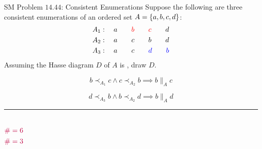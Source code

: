 
\begin{frame}{}
  \begin{exampleblock}{SM Problem $14.44$: Consistent Enumerations}
    Suppose the following are three consistent enumerations of an ordered set $A = \{a, b, c, d\}$:
    \begin{align*}
      A_1: \quad a \qquad \textcolor{red}{b} \qquad \textcolor{red}{c} \qquad d \\
      A_2: \quad a \qquad c \qquad b \qquad d \\
      A_3: \quad a \qquad c \qquad \textcolor{blue}{d} \qquad \textcolor{blue}{b}
    \end{align*}
    Assuming the Hasse diagram $D$ of $A$ is , draw $D$.
  \end{exampleblock}

  \pause
  \[
    b \prec_{A_1} c \land c \prec_{A_2} b \implies b \parallel_{A} c
  \]

  \pause
  \[
    d \prec_{A_3} b \land b \prec_{A_2} d \implies b \parallel_{A} d
  \]
\end{frame}

\begin{frame}{}

  \hrule
  \begin{columns}[t]
    \pause
      \pause
      \[
	\textcolor{purple}{\# = 6}
      \]
    \pause
      \pause
      \[
	\textcolor{purple}{\# = 3}
      \]
  \end{columns}
\end{frame}

\begin{frame}{}
  \begin{figure}
    \centering
    \resizebox{0.90\textwidth}{!}{}
  \end{figure}

\end{frame}
